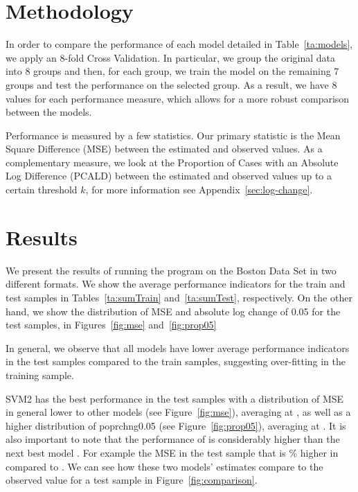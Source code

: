 \documentclass[10pt, letterpaper ]{article}
\begin{document}
\section{Methodology}


In order to compare the performance of each model detailed in Table~\ref{ta:models}, we apply an 8-fold Cross Validation. In particular, we group the original data into 8 groups and then, for each group, we train the model on the remaining 7 groups and test the performance on the selected group. As a result, we have 8 values for each performance measure, which allows for a more robust comparison between the models. 

Performance is measured by a few statistics. Our primary statistic is the Mean Square Difference (MSE) between the estimated and observed values. As a complementary measure, we look at the Proportion of Cases with an Absolute Log Difference (PCALD) between the estimated and observed values up to a certain threshold $k$, for more information see Appendix~\ref{sec:log-change}. 


\section{Results}


We present the results of running the program on the Boston Data Set in two different formats. We show the average performance indicators for the train and test samples in Tables~\ref{ta:sumTrain} and~\ref{ta:sumTest}, respectively. On the other hand, we show the distribution of MSE and  absolute log change of 0.05 for the test samples, in Figures~\ref{fig:mse} and~\ref{fig:prop05}

In general, we observe that all models have lower average performance indicators in the test samples compared to the train samples, suggesting over-fitting in the training sample.

SVM2 has the best performance in the test samples with a distribution of MSE in general lower to other models (see Figure~\ref{fig:mse}), averaging at \sBestModelMSE, as well as a higher distribution of poprchng0.05 (see Figure~\ref{fig:prop05}), averaging at \sBestModelPropFive. It is also important to note that the performance of \sBestModel{} is considerably higher than the next best model \sSecondBestModel{} . For example the MSE in the test sample that is \sBestChangeMSE\% higher in \sSecondBestModel{} compared to \sBestModel{}. We can see how these two models' estimates compare to the observed value for a test sample in Figure~\ref{fig:comparison}.
\end{document}
